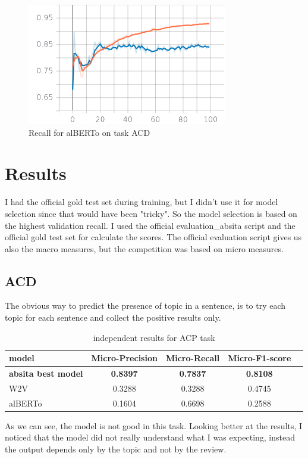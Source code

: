 \documentclass{article}
\begin{document}
\begin{figure}[!htb]
\begin{minipage}{0.48\textwidth}
                    \centering
                    \includegraphics[width=.7\linewidth]{alberto_acd_epoch_recall.png}
                    \caption{Recall for alBERTo on task ACD}\label{Fig:Data12}
                \end{minipage}
            \end{figure}

    \section{Results}\label{sec:s5}
        I had the official gold test set during training, but I didn't use it for model selection since that would have been "tricky".
        So the model selection is based on the highest validation recall.
        I used the official evaluation\_absita script and the official gold test set for calculate the scores.
        The official evaluation script gives us also the macro measures, but the competition was based on micro measures.
        \subsection{ACD}\label{subsec:s5}
            The obvious way to predict the presence of topic in a sentence, is to try each topic for each sentence and collect the positive results only.
                \begin{table}[h!]
                    \begin{center}
                        \caption{independent results for ACP task}
                        \label{tab:table2}
                        \begin{tabular}{l|c|c|c|r}
                            \textbf{model} & \textbf{Micro-Precision} & \textbf{Micro-Recall} & \textbf{Micro-F1-score}\\
                            \hline
                                \textbf{absita best model} & \textbf{0.8397} & \textbf{0.7837} & \textbf{0.8108}\\
                                W2V & 0.3288 & 0.3288 & 0.4745\\
                                alBERTo & 0.1604 & 0.6698 & 0.2588\\
                        \end{tabular}
                    \end{center}
                \end{table}
        As we can see, the model is not good in this task.
        Looking better at the results, I noticed that the model did not really understand what I was expecting,
        instead the output depends only by the topic and not by the review.
\end{document}

